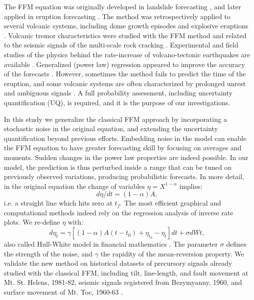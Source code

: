 \documentclass{article}
\begin{document}
The FFM equation was originally developed in landslide forecasting \citep{Voight1987, Voight1988b, Voight1989b}, and later applied in eruption forecasting \citep{Voight1988, Voight1989, Cornelius1995}. The method was retrospectively applied to several volcanic systems, including dome growth episodes and explosive eruptions \citep{Voight1991, Cornelius1994, Cornelius1996, Voight2000}. Volcanic tremor characteristics were studied with the FFM method and related to the seismic signals of the multi-scale rock cracking \citep{Kilburn1998,Ortiz2003,Kilburn2003}. Experimental and field studies of the physics behind the rate-increase of volcano-tectonic earthquakes are available \citep{Smith2009,Smith2010}. Generalized (power law) regression appeared to improve the accuracy of the forecasts \citep{Bell2011}. However, sometimes the method fails to predict the time of the eruption, and some volcanic systems are often characterized by prolonged unrest and ambiguous signals \citep{Chiodini2016}. A full probability assessment, including uncertainty quantification (UQ), is required, and it is the purpose of our investigations.

In this study we generalize the classical FFM approach by incorporating a stochastic noise in the original equation, and extending the uncertainty quantification beyond previous efforts. Embedding noise in the model can enable the FFM equation to have greater forecasting skill by focusing on averages and moments. Sudden changes in the power law properties are indeed possible. In our model, the prediction is thus perturbed inside a range that can be tuned on previously observed variations, producing probabilistic forecasts. In more detail, in the original equation the change of variables $\eta=X^{1-\alpha}$ implies:
$$d\eta/dt=(1-\alpha)A,$$
i.e. a straight line which hits zero at $t_f$. The most efficient graphical and computational methods indeed rely on the regression analysis of inverse rate plots. We re-define $\eta$ with:
$$d\eta_t=\gamma[(1-\alpha)A(t-t_0)+\eta_{t_0}-\eta_t]dt+\sigma dWt,$$
also called Hull-White model in financial mathematics \citep{HullWhite1990}. The parameter $\sigma$ defines the strength of the noise, and $\gamma$ the rapidity of the mean-reversion property. We validate the new method on historical datasets of precursory signals already studied with the classical FFM, including tilt, line-length, and fault movement at Mt. St. Helens, 1981-82, seismic signals registered from Bezymyanny, 1960, and surface movement of Mt. Toc, 1960-63 \citep{Voight1988}.
\end{document}
